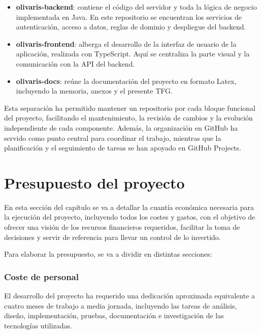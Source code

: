 \begin{itemize}
    \item \textbf{olivaris-backend}: contiene el código del servidor y toda la lógica de negocio implementada en Java. En este repositorio se encuentran los 
    servicios de autenticación, acceso a datos, reglas de dominio y despliegue del backend.

    \item \textbf{olivaris-frontend}: alberga el desarrollo de la interfaz de usuario de la aplicación, realizada con TypeScript. Aquí se centraliza la parte 
    visual y la comunicación con la API del backend.

    \item \textbf{olivaris-docs}: reúne la documentación del proyecto en formato Latex, incluyendo la memoria, anexos y el presente TFG.
\end{itemize}

Esta separación ha permitido mantener un repositorio por cada bloque funcional del proyecto, facilitando el mantenimiento, la revisión de cambios y la evolución 
independiente de cada componente. Además, la organización en GitHub ha servido como punto central para coordinar el trabajo, mientras que la planificación y el 
seguimiento de tareas se han apoyado en GitHub Projects.

\section{Presupuesto del proyecto}

En esta sección del capítulo se va a detallar la cuantía económica necesaria para la ejecución del proyecto, incluyendo todos los costes y gastos, con el 
objetivo de ofrecer una visión de los recursos financieros requeridos, facilitar la toma de decisiones y servir de referencia para 
llevar un control de lo invertido.

Para elaborar la presupuesto, se va a dividir en distintas secciones:

\subsubsection{Coste de personal}

El desarrollo del proyecto ha requerido una dedicación aproximada equivalente a cuatro meses de trabajo a media jornada, incluyendo las tareas de análisis, 
diseño, implementación, pruebas, documentación e investigación de las tecnologías utilizadas.

